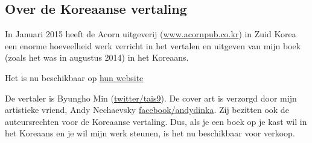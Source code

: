 



\subsection*{Over de Koreaanse vertaling}

In Januari 2015 heeft de Acorn uitgeverij (\href{http://www.acornpub.co.kr}{www.acornpub.co.kr}) in Zuid Korea een enorme hoeveelheid werk verricht in het vertalen en uitgeven
van mijn boek (zoals het was in augustus 2014) in het Koreaans.

Het is nu beschikbaar op
\href{http://go.yurichev.com/17343}{hun website}

\iffalse
\begin{figure}[H]
\centering
\texttt{[image: acorn\_cover.jpg]}
\end{figure}
\fi

De vertaler is Byungho Min (\href{http://go.yurichev.com/17344}{twitter/tais9}).
De cover art is verzorgd door mijn artistieke vriend, Andy Nechaevsky
\href{http://go.yurichev.com/17023}{facebook/andydinka}.
Zij bezitten ook de auteursrechten voor de Koreaanse vertaling.
Dus, als je een  boek op je kast wil in het Koreaans en je
wil mijn werk steunen, is het nu beschikbaar voor verkoop.


